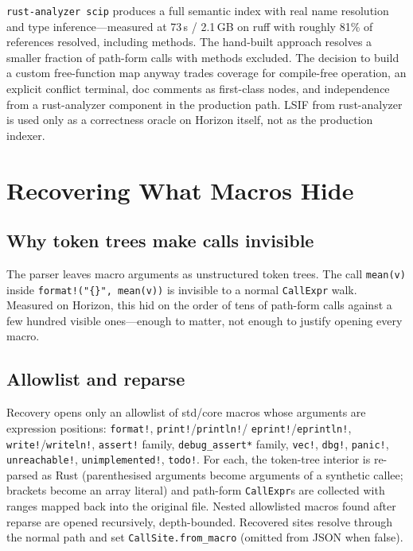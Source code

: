 \documentclass[11pt,a4paper,oneside]{report}
\newcommand{\horizon}{Horizon}
\begin{document}
\texttt{rust-analyzer scip} produces a full semantic index with real name
resolution and type inference---measured at 73\,s / 2.1\,GB on ruff with
roughly 81\% of references resolved, including methods. The hand-built
approach resolves a smaller fraction of path-form calls with methods excluded.
The decision to build a custom free-function map anyway trades coverage for
compile-free operation, an explicit conflict terminal, doc comments as
first-class nodes, and independence from a rust-analyzer component in the
production path. LSIF from rust-analyzer is used only as a correctness oracle
on \horizon{} itself, not as the production indexer.

\chapter{Recovering What Macros Hide}
\label{ch:macros}

\section{Why token trees make calls invisible}

The parser leaves macro arguments as unstructured token trees. The call
\texttt{mean(v)} inside \texttt{format!("\{\}", mean(v))} is invisible to a
normal \texttt{CallExpr} walk. Measured on \horizon{}, this hid on the order
of tens of path-form calls against a few hundred visible ones---enough to
matter, not enough to justify opening every macro.

\section{Allowlist and reparse}

Recovery opens only an allowlist of std/core macros whose arguments are
expression positions: \texttt{format!}, \texttt{print!}/\texttt{println!}/
\texttt{eprint!}/\texttt{eprintln!}, \texttt{write!}/\texttt{writeln!},
\texttt{assert!} family, \texttt{debug\_assert*} family, \texttt{vec!},
\texttt{dbg!}, \texttt{panic!}, \texttt{unreachable!},
\texttt{unimplemented!}, \texttt{todo!}. For each, the token-tree interior is
re-parsed as Rust (parenthesised arguments become arguments of a synthetic
callee; brackets become an array literal) and path-form \texttt{CallExpr}s
are collected with ranges mapped back into the original file. Nested
allowlisted macros found after reparse are opened recursively, depth-bounded.
Recovered sites resolve through the normal path and set
\texttt{CallSite.from\_macro} (omitted from JSON when false).
\end{document}
